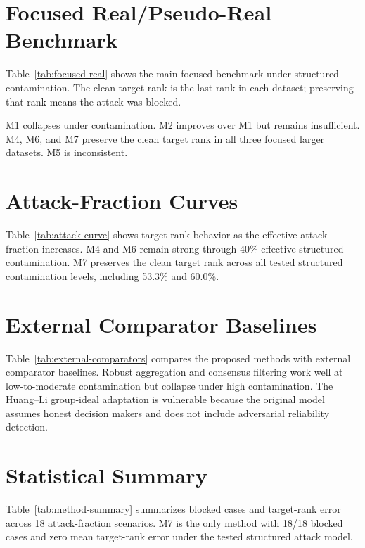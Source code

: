\section{Focused Real/Pseudo-Real Benchmark}
Table~\ref{tab:focused-real} shows the main focused benchmark under structured contamination. The clean target rank is the last rank in each dataset; preserving that rank means the attack was blocked.



M1 collapses under contamination. M2 improves over M1 but remains insufficient. M4, M6, and M7 preserve the clean target rank in all three focused larger datasets. M5 is inconsistent.

\section{Attack-Fraction Curves}
Table~\ref{tab:attack-curve} shows target-rank behavior as the effective attack fraction increases. M4 and M6 remain strong through 40\% effective structured contamination. M7 preserves the clean target rank across all tested structured contamination levels, including 53.3\% and 60.0\%.



\section{External Comparator Baselines}
Table~\ref{tab:external-comparators} compares the proposed methods with external comparator baselines. Robust aggregation and consensus filtering work well at low-to-moderate contamination but collapse under high contamination. The Huang--Li group-ideal adaptation is vulnerable because the original model assumes honest decision makers and does not include adversarial reliability detection.



\section{Statistical Summary}
Table~\ref{tab:method-summary} summarizes blocked cases and target-rank error across 18 attack-fraction scenarios. M7 is the only method with 18/18 blocked cases and zero mean target-rank error under the tested structured attack model.



